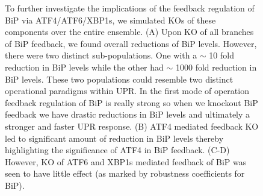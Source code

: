 \begin{figure}\centering
	\caption{To further investigate the implications of the feedback regulation of BiP via ATF4/ATF6/XBP1s, we simulated KOs of these components over the entire ensemble. (A) Upon KO of all branches of BiP feedback, we found overall reductions of BiP levels. However, there were two distinct sub-populations. One with a $\sim$ 10 fold reduction in BiP levels while the other had $\sim$ 1000 fold reduction in BiP levels. These two populations could resemble two distinct operational paradigms within UPR. In the first mode of operation feedback regulation of BiP is really strong so when we knockout BiP feedback we have drastic reductions in BiP levels and ultimately a stronger and faster UPR response. (B) ATF4 mediated feedback KO led to significant amount of reduction in BiP levels thereby highlighting the significance of ATF4 in BiP feedback. (C-D) However, KO of ATF6 and XBP1s mediated feedback of BiP was seen to have little effect (as marked by robustness coefficients for BiP).}
	\label{fg:COUP_S2}
\end{figure}